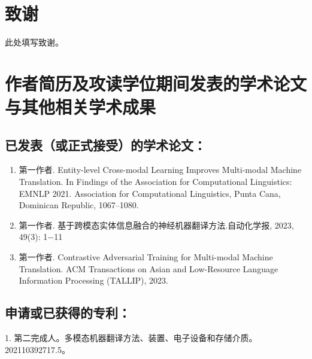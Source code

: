 \chapter[致谢]{致\quad 谢}%

此处填写致谢。


\chapter{作者简历及攻读学位期间发表的学术论文与其他相关学术成果}





\section*{已发表（或正式接受）的学术论文：}

{
\setlist[enumerate]{}%
\begin{enumerate}[nosep]
    \item 第一作者. Entity-level Cross-modal Learning Improves Multi-modal Machine Translation. In Findings of the Association for Computational Linguistics: EMNLP 2021. Association for Computational Linguistics, Punta Cana, Dominican Republic, 1067–1080.
    \item 第一作者. 基于跨模态实体信息融合的神经机器翻译方法.自动化学报, 2023, 49(3): 1−11
    \item 第一作者. Contrastive Adversarial Training for Multi-modal Machine Translation. ACM Transactions on Asian and Low-Resource Language Information Processing (TALLIP), 2023.
\end{enumerate}
}

\section*{申请或已获得的专利：}

1. 第二完成人。多模态机器翻译方法、装置、电子设备和存储介质。202110392717.5。



\cleardoublepage[plain]%
